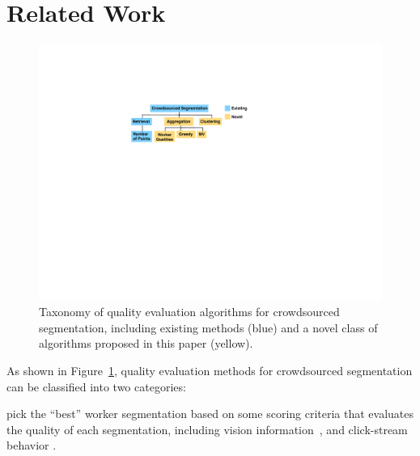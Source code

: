 \section{Related Work\label{sec:related}}
\begin{figure}[h!]
\centering
\includegraphics[width=0.75\linewidth]{plots/flowchart.pdf}
\caption{Taxonomy of quality evaluation algorithms for crowdsourced segmentation, including existing methods (blue) and a novel class of algorithms proposed in this paper (yellow).\vspace{-15pt}} %
\label{flowchart}
\end{figure}
As shown in Figure~\ref{flowchart}, quality evaluation methods for crowdsourced segmentation can be classified into two categories:

 pick the ``best'' worker segmentation based on some scoring criteria that evaluates the quality of each segmentation, including vision information~\cite{Vittayakorn2011,Russakovsky2015}, and click-stream behavior \cite{Cabezas2015,Sameki2015,Sorokin2008}.

